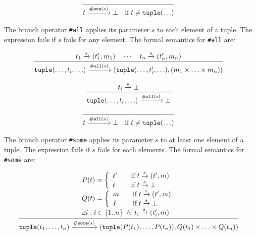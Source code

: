 \begin{equation}
\infer
  {t \arr{\mathtt{\#one}(s)} \bot
  \quad\mbox{if}\; t \neq \mathtt{tuple}(\ldots)}
  {}  
\end{equation}


The branch operator \texttt{\#all} applies its parameter $s$ to
each element of a tuple. The expression fails if $s$ fails for any
element. The formal semantics for \texttt{\#all} are:

\begin{equation}
\infer{
  \mathtt{tuple}(\ldots,t_i,\ldots)
  \arr{\mathtt{\#all}(s)}
  (\mathtt{tuple}(\ldots,t_i',\ldots),
  (m_1 \times \ldots \times m_n))
}{
  t_1 \arr{s} (t_1',m_1) \quad \cdots \quad t_n \arr{s} (t_n',m_n)
}
\end{equation}

\begin{equation}
\infer
  {\mathtt{tuple}(\ldots,t_i,\ldots) \arr{\mathtt{\#all}(s)} \bot}
  {t_i \arr{s} \bot}  
\end{equation}

\begin{equation}
\infer
  {t \arr{\mathtt{\#all}(s)} \bot
  \quad\mbox{if}\; t \neq \mathtt{tuple}(\ldots)}
  {}  
\end{equation}


The branch operator \texttt{\#some} applies its parameter $s$ to
at least one element of a tuple. The expression fails if $s$ fails
for each elements. The formal semantics for \texttt{\#some} are:

\begin{equation}
\infer{
  \mathtt{tuple}(t_1,\ldots,t_n)
  \arr{\mathtt{\#some}(s)}
  (\mathtt{tuple}(P(t_1),\ldots,P(t_n)),
   Q(t_1) \times \ldots \times Q(t_n))
}{
\begin{array}{l}
P(t) = \left\{
  \begin{array}{l l}
    t' & \quad \text{if}\; t \arr{s} (t',m) \\
    t  & \quad \text{if}\; t \arr{s} \bot \\
  \end{array}\right.\\
Q(t) = \left\{ 
  \begin{array}{l l}
    m & \quad \text{if}\; t \arr{s} (t',m) \\
    I & \quad \text{if}\; t \arr{s} \bot \\
  \end{array}\right.\\
\exists{i} : i \in \{1..n\} \;\wedge\; t_i \arr{s} (t'_i,m)\\
\end{array}
}
\end{equation}

